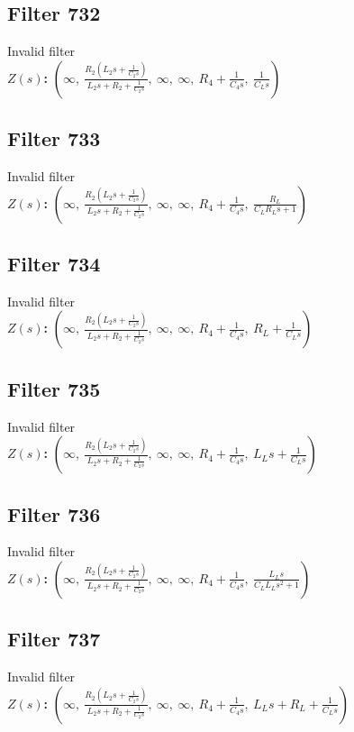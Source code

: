 \documentclass{article}
\begin{document}
\subsection*{Filter 732}
Invalid filter \\ 
\textbf{$Z(s)$:} $\left( \infty, \  \frac{R_{2} \left(L_{2} s + \frac{1}{C_{2} s}\right)}{L_{2} s + R_{2} + \frac{1}{C_{2} s}}, \  \infty, \  \infty, \  R_{4} + \frac{1}{C_{4} s}, \  \frac{1}{C_{L} s}\right)$ \\ 
\subsection*{Filter 733}
Invalid filter \\ 
\textbf{$Z(s)$:} $\left( \infty, \  \frac{R_{2} \left(L_{2} s + \frac{1}{C_{2} s}\right)}{L_{2} s + R_{2} + \frac{1}{C_{2} s}}, \  \infty, \  \infty, \  R_{4} + \frac{1}{C_{4} s}, \  \frac{R_{L}}{C_{L} R_{L} s + 1}\right)$ \\ 
\subsection*{Filter 734}
Invalid filter \\ 
\textbf{$Z(s)$:} $\left( \infty, \  \frac{R_{2} \left(L_{2} s + \frac{1}{C_{2} s}\right)}{L_{2} s + R_{2} + \frac{1}{C_{2} s}}, \  \infty, \  \infty, \  R_{4} + \frac{1}{C_{4} s}, \  R_{L} + \frac{1}{C_{L} s}\right)$ \\ 
\subsection*{Filter 735}
Invalid filter \\ 
\textbf{$Z(s)$:} $\left( \infty, \  \frac{R_{2} \left(L_{2} s + \frac{1}{C_{2} s}\right)}{L_{2} s + R_{2} + \frac{1}{C_{2} s}}, \  \infty, \  \infty, \  R_{4} + \frac{1}{C_{4} s}, \  L_{L} s + \frac{1}{C_{L} s}\right)$ \\ 
\subsection*{Filter 736}
Invalid filter \\ 
\textbf{$Z(s)$:} $\left( \infty, \  \frac{R_{2} \left(L_{2} s + \frac{1}{C_{2} s}\right)}{L_{2} s + R_{2} + \frac{1}{C_{2} s}}, \  \infty, \  \infty, \  R_{4} + \frac{1}{C_{4} s}, \  \frac{L_{L} s}{C_{L} L_{L} s^{2} + 1}\right)$ \\ 
\subsection*{Filter 737}
Invalid filter \\ 
\textbf{$Z(s)$:} $\left( \infty, \  \frac{R_{2} \left(L_{2} s + \frac{1}{C_{2} s}\right)}{L_{2} s + R_{2} + \frac{1}{C_{2} s}}, \  \infty, \  \infty, \  R_{4} + \frac{1}{C_{4} s}, \  L_{L} s + R_{L} + \frac{1}{C_{L} s}\right)$ \\ 
\end{document}
